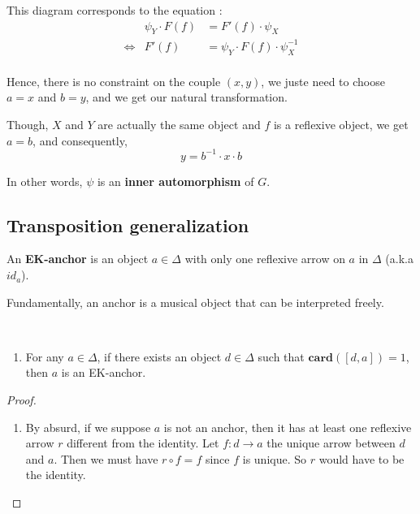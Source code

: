 This diagram corresponds to the equation :
\begin{eqnarray*}
    &\psi_Y\cdot F(f) &=   F'(f) \cdot \psi_X \\
    \Leftrightarrow &
    F'(f) &=   \psi_Y\cdot F(f) \cdot \psi_X^{-1}\\
\end{eqnarray*}

Hence, there is no constraint on the couple $(x,y)$, we juste need to choose $a = x$ and $b = y$, and we get our natural transformation.

Though, $X$ and $Y$ are actually the same object and $f$ is a reflexive object, we get $a = b$, and consequently,
$$y = b^{-1}\cdot x \cdot b $$

In other words, $\psi$ is an \textbf{inner automorphism} of $G$.


\subsection{Transposition generalization}

\begin{defn}

\end{defn}

\begin{defn}[EK-anchor]
    An \textbf{EK-anchor} is an object $a\in\Delta$  with only one reflexive arrow on $a$ in $\Delta$ (a.k.a $id_a$).
\end{defn}

Fundamentally, an anchor is a musical object that can be interpreted freely.

\begin{prop}~
    \begin{enumerate}
        \item For any $a\in \Delta$, if there exists an object $d\in \Delta$ such that $\textbf{card}([d,a]) = 1$, then $a$ is an EK-anchor.
    \end{enumerate}
    \label{anchorProp}
\end{prop}

\begin{proof}
    \begin{enumerate}
        \item By absurd, if we suppose $a$ is not an anchor, then it has at least one reflexive arrow $r$ different from the identity. Let $f : d\rightarrow a$ the unique arrow between $d$ and $a$. Then we must have $r \circ f = f$ since $f$ is unique. So $r$ would have to be the identity.
    \end{enumerate}
\end{proof}

